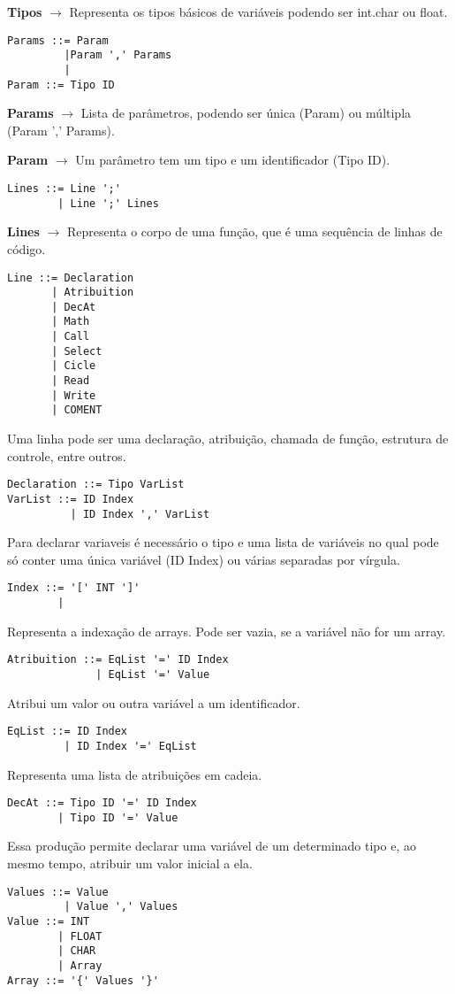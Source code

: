 \documentclass[12pt,a4paper]{report}
\begin{document}
\textbf{Tipos} $\rightarrow$ Representa os tipos básicos de variáveis podendo ser int.char ou float.         
\begin{lstlisting}
Params ::= Param
         |Param ',' Params
         | 
Param ::= Tipo ID
\end{lstlisting}

\textbf{Params} $\rightarrow$ Lista de parâmetros, podendo ser única (Param) ou múltipla (Param ',' Params).

\textbf{Param} $\rightarrow$ Um parâmetro tem um tipo e um identificador (Tipo ID).
\begin{lstlisting}
Lines ::= Line ';'
        | Line ';' Lines
\end{lstlisting}

\textbf{Lines} $\rightarrow$ Representa o corpo de uma função, que é uma sequência de linhas de código.
\begin{lstlisting}
Line ::= Declaration
       | Atribuition
       | DecAt
       | Math
       | Call
       | Select
       | Cicle
       | Read
       | Write
       | COMENT
\end{lstlisting}
Uma linha pode ser uma declaração, atribuição, chamada de função, estrutura de controle, entre outros.
\begin{lstlisting}
Declaration ::= Tipo VarList
VarList ::= ID Index
          | ID Index ',' VarList
\end{lstlisting}
Para declarar variaveis é necessário o tipo e uma lista de variáveis no qual pode só conter uma única variável (ID Index) ou várias separadas por vírgula.
\begin{lstlisting}
Index ::= '[' INT ']'
        | 
\end{lstlisting}
Representa a indexação de arrays. Pode ser vazia, se a variável não for um array.
\begin{lstlisting}
Atribuition ::= EqList '=' ID Index
              | EqList '=' Value
\end{lstlisting}
Atribui um valor ou outra variável a um identificador.
\begin{lstlisting}
EqList ::= ID Index
         | ID Index '=' EqList
\end{lstlisting}
Representa uma lista de atribuições em cadeia.
\begin{lstlisting}
DecAt ::= Tipo ID '=' ID Index
        | Tipo ID '=' Value
\end{lstlisting}
Essa produção permite declarar uma variável de um determinado tipo e, ao mesmo tempo, atribuir um valor inicial a ela.
\begin{lstlisting}
Values ::= Value
         | Value ',' Values
Value ::= INT
        | FLOAT
        | CHAR
        | Array
Array ::= '{' Values '}'
\end{lstlisting}
\end{document}
